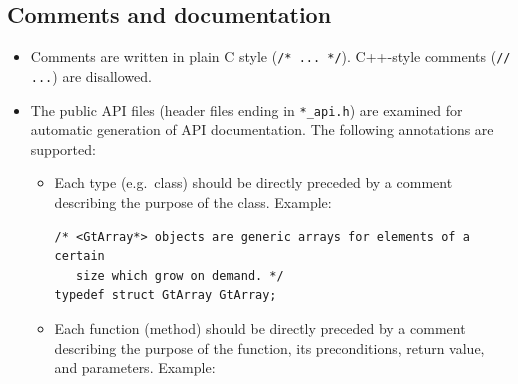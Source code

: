\documentclass[11pt,final]{article}
\newcommand{\keyword}[1]{\lstinline{#1}}
\begin{document}
\subsection{Comments and documentation}
\label{documentation}
\begin{itemize}
\item
Comments are written in plain C style (\keyword{/* ... */}). C++-style
comments (\keyword{// ...}) are disallowed.
\item
The public API files (header files ending in \keyword{*_api.h}) are examined for
automatic generation of API documentation. The following annotations are
supported:
\begin{itemize}
\item
Each type (e.g.\ class) should be directly preceded by a comment describing the
purpose of the class. Example:

\begin{lstlisting}
/* <GtArray*> objects are generic arrays for elements of a certain
   size which grow on demand. */
typedef struct GtArray GtArray;
\end{lstlisting}

\item
Each function (method) should be directly preceded by a comment describing the
purpose of the function, its preconditions, return value, and parameters.
Example:


\end{itemize}
\end{itemize}
\end{document}
